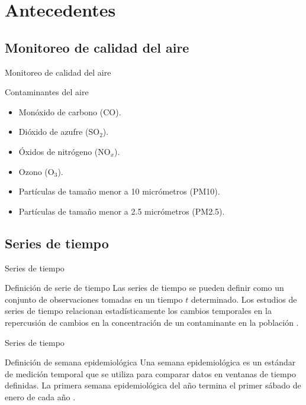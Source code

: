 \documentclass[11pt]{beamer}
\begin{document}
\section{Antecedentes}

\subsection{Monitoreo de calidad del aire}
\begin{frame}{Monitoreo de calidad del aire}
\begin{block}{Contaminantes del aire} \justifying
\begin{itemize}
	\item Monóxido de carbono (CO).
	\item Dióxido de azufre (SO$_2$).
	\item Óxidos de nitrógeno (NO$_x$).
	\item Ozono (O$_3$).
	\item Partículas de tamaño menor a 10 micrómetros (PM10).
	\item Partículas de tamaño menor a 2.5 micrómetros (PM2.5).
\end{itemize}
\end{block}
\end{frame}
\subsection{Series de tiempo}
\begin{frame}{Series de tiempo}
\begin{block}{Definición de serie de tiempo} \justifying
Las series de tiempo se pueden definir como un conjunto de observaciones tomadas en un tiempo $t$ determinado. Los estudios de series de tiempo relacionan estadísticamente los cambios temporales en la repercusión de cambios en la concentración de un contaminante en la población \citep{r8}.
\end{block}
\end{frame}
\begin{frame}{Series de tiempo}
\begin{block}{Definición de semana epidemiológica} \justifying
Una semana epidemiológica es un estándar de medición temporal que se utiliza para comparar datos en ventanas de tiempo definidas. La primera semana epidemiológica del año termina el primer sábado de enero de cada año \citep{r7}.
\end{block}
\end{frame}
\end{document}
